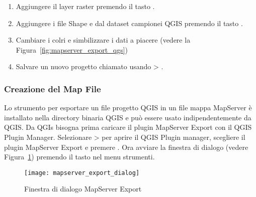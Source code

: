 \begin{enumerate}
\item Aggiungere il layer raster  premendo il tasto 
.
\item Aggiungere i file Shape  e 
 dal dataset campionei QGIS premendo il tasto 
 .
\item Cambiare i colri e simbilizzare i dati a piacere (vedere la Figura~\ref{fig:mapserver_export_qgs})
\item Salvare un nuovo progetto chiamato  usando 
 > .
\end{enumerate} 

\subsubsection{Creazione del Map File}

Lo strumento  per esportare un file progetto QGIS in un file mappa MapServer è installato nella directory binaria QGIS e può essere usato indipendentemente da QGIS. Da QGIs bisogna prima caricare il plugin MapServer Export con il QGIS Plugin Manager. 
Selezionare  >  per aprire il QGIS Plugin manager, 
scegliere il plugin MapServer Export e premere . Ora avviare la finestra di dialogo 
 (vedere 
Figura~\ref{fig:mapserver_export_dialog}) premendo il tasto nel menu strumenti.

\begin{figure}[ht]
\begin{center}
  \caption{Finestra di dialogo MapServer Export \nixcaption}
  \label{fig:mapserver_export_dialog}\smallskip
  \texttt{[image: mapserver\_export\_dialog]}
\end{center}
\end{figure}

